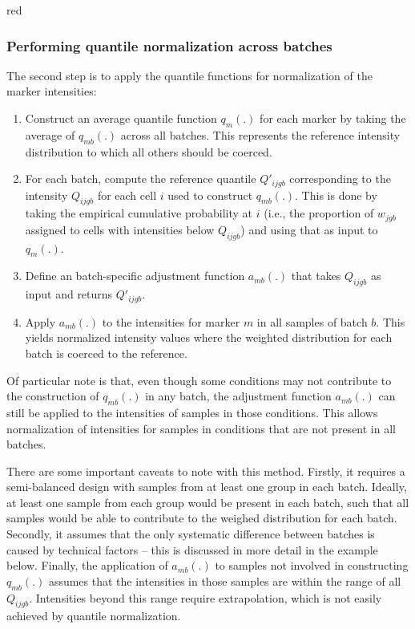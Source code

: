 \documentclass{article}
\begin{document}
\begin{color}{red}
\subsubsection{Performing quantile normalization across batches}
The second step is to apply the quantile functions for normalization of the marker intensities:
\begin{enumerate}
    \item Construct an average quantile function $q_m(.)$ for each marker by taking the average of $q_{mb}(.)$ across all batches.
        This represents the reference intensity distribution to which all others should be coerced.
    \item For each batch, compute the reference quantile $Q'_{ijgb}$ corresponding to the intensity $Q_{ijgb}$ for each cell $i$ used to construct $q_{mb}(.)$.
        This is done by taking the empirical cumulative probability at $i$ (i.e., the proportion of $w_{jgb}$ assigned to cells with intensities below $Q_{ijgb}$) and using that as input to $q_m(.)$.
    \item Define an batch-specific adjustment function $a_{mb}(.)$ that takes $Q_{ijgb}$ as input and returns $Q'_{ijgb}$.
    \item Apply $a_{mb}(.)$ to the intensities for marker $m$ in all samples of batch $b$.
        This yields normalized intensity values where the weighted distribution for each batch is coerced to the reference. 
\end{enumerate}
Of particular note is that, even though some conditions may not contribute to the construction of $q_{mb}(.)$ in any batch, the adjustment function $a_{mb}(.)$ can still be applied to the intensities of samples in those conditions.
This allows normalization of intensities for samples in conditions that are not present in all batches.

There are some important caveats to note with this method.
Firstly, it requires a semi-balanced design with samples from at least one group in each batch.
Ideally, at least one sample from each group would be present in each batch, such that all samples would be able to contribute to the weighed distribution for each batch.
Secondly, it assumes that the only systematic difference between batches is caused by technical factors -- this is discussed in more detail in the example below.
Finally, the application of $a_{mb}(.)$ to samples not involved in constructing $q_{mb}(.)$ assumes that the intensities in those samples are within the range of all $Q_{ijgb}$.
Intensities beyond this range require extrapolation, which is not easily achieved by quantile normalization.


\end{color}
\end{document}
